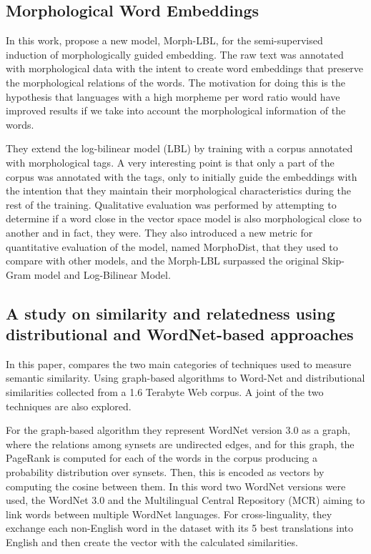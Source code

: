 \subsection{Morphological Word Embeddings}


In this work,  propose a new model, Morph-LBL, for the semi-supervised induction of morphologically guided embedding. The raw text was annotated with morphological data with the intent to create word embeddings that preserve the morphological relations of the words. The motivation for doing this is the hypothesis that languages with a high morpheme per word ratio would have improved results if we take into account the morphological information of the words.

They extend the log-bilinear model (LBL) by training with a corpus annotated with morphological tags. A very interesting point is that only a part of the corpus was annotated with the tags, only to initially guide the embeddings with the intention that they maintain their morphological characteristics during the rest of the training.
Qualitative evaluation was performed by attempting to determine if a word close in the vector space model is also morphological close to another and in fact, they were.
They also introduced a new metric for quantitative evaluation of the model, named MorphoDist, that they used to compare with other models, and the Morph-LBL surpassed the original Skip-Gram model and Log-Bilinear Model.

\subsection{A study on similarity and relatedness using distributional and WordNet-based approaches}


In this paper,  compares the two main categories of techniques used to measure semantic similarity. Using graph-based algorithms to Word-Net and distributional similarities collected from a 1.6 Terabyte Web corpus. A joint of the two techniques are also explored.

For the graph-based algorithm they represent WordNet version 3.0 as a graph, where the relations among synsets are undirected edges, and for this graph, the PageRank is computed for each of the words in the corpus producing a probability distribution over synsets. Then, this is encoded as vectors by computing the cosine between them. In this word two WordNet versions were used, the WordNet 3.0 and the Multilingual Central Repository (MCR) aiming to link words between multiple WordNet languages. For cross-linguality, they exchange each non-English word in the dataset with its 5 best translations into English and then create the vector with the calculated similarities.

